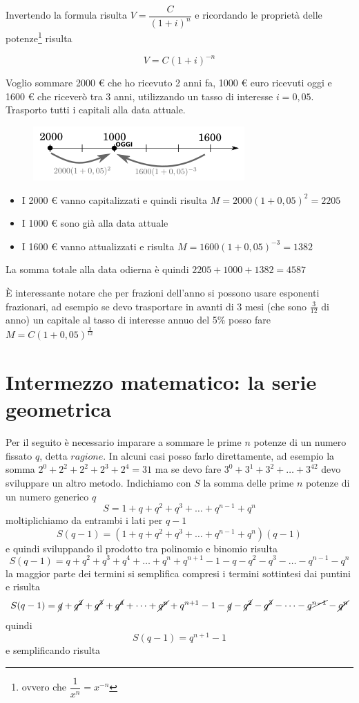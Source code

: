 Invertendo la formula risulta \(V=\dfrac{C}{(1+i)^n}\) e ricordando le 
proprietà delle potenze\footnote{ovvero che \(\dfrac{1}{x^n}=x^{-n}\)}
risulta

\begin{definizione}[Attualizzazione]
\[ V=C(1+i)^{-n}\]
\end{definizione}
\begin{exrig}
\begin{esempio}
Voglio sommare 2000 € che ho ricevuto 2 anni fa, 1000 € euro ricevuti oggi 
e 1600 € che riceverò tra 3 anni, utilizzando un tasso di interesse 
\(i=0,05\).
Trasporto tutti i capitali alla data attuale.
\begin{figure}[htp]
\centering
\includegraphics[scale=.60]{img/esempio.png}
\end{figure}
\begin{itemize}
\item I 2000 € vanno capitalizzati e quindi risulta \(M=2000(1+0,05)^2=2205\)
\item I 1000 € sono già alla data attuale
\item I 1600 € vanno attualizzati e risulta \(M=1600(1+0,05)^{-3}=1382\)
\end{itemize}
La somma totale alla data odierna è quindi \(2205+1000+1382=4587\)
\end{esempio}
\end{exrig}

È interessante notare che per frazioni dell'anno si possono usare 
esponenti frazionari, ad esempio se devo trasportare in avanti di 3 mesi 
(che sono \(\frac{3}{12}\) di anno) un capitale al tasso di interesse annuo 
del 5\% posso fare 
\(M=C(1+0,05)^{\frac{3}{12}}\)

\section{Intermezzo matematico: la serie geometrica}
Per il seguito è necessario imparare a sommare le prime \(n\) potenze di un 
numero fissato \(q\), detta \(ragione\). In alcuni casi posso farlo 
direttamente, ad esempio la somma \(2^0+2^2+2^2+2^3+2^4=31\) ma se devo fare
\(3^0+3^1+3^2+\dots+3^{42}\) devo sviluppare un altro metodo.
Indichiamo con \(S\) la somma delle prime \(n\) potenze di un numero generico 
\(q\)
\[ S= 1+q+q^2+q^3+\dots + q^{n-1}+q^n\]
moltiplichiamo da entrambi i lati per \(q-1\) 
\[ S(q-1)= (1+q+q^2+q^3+\dots + q^{n-1}+q^n)(q-1)\]
e quindi sviluppando il prodotto tra polinomio e binomio risulta
\[ S(q-1)= q+q^2+q^3+q^4+\dots + q^{n}+q^{n+1}-1-q-q^2-q^3-\dots - 
q^{n-1}-q^n\]
la maggior parte dei termini si semplifica compresi i termini sottintesi 
dai puntini e risulta
\[ S(q-1)= \cancel{q}+\cancel{q^2}+\cancel{q^3}+\cancel{q^4}+\dots + 
\cancel{q^n}+q^{n+1}-1-\cancel{q}-\cancel{q^2}-\cancel{q^3}-\dots - 
\cancel{q^{n-1}}-\cancel{q^n}\]
quindi
\[S(q-1)=q^{n+1}-1 \]
e semplificando risulta

